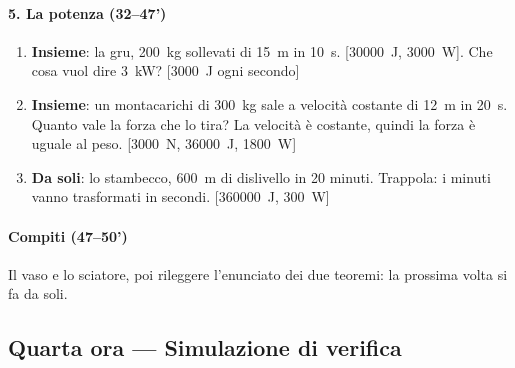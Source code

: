 \documentclass[11pt]{report}
\begin{document}
\paragraph{5. La potenza (32--47')}
\begin{enumerate}
  \item \textbf{Insieme}: la gru, \SI{200}{\kilogram} sollevati di \SI{15}{\metre} in \SI{10}{\second}. [\SI{30000}{\joule}, \SI{3000}{\watt}]. Che cosa vuol dire \SI{3}{\kilo\watt}? [\SI{3000}{\joule} ogni secondo]
  \item \textbf{Insieme}: un montacarichi di \SI{300}{\kilogram} sale a velocità costante di \SI{12}{\metre} in \SI{20}{\second}. Quanto vale la forza che lo tira? La velocità è costante, quindi la forza è uguale al peso. [\SI{3000}{\newton}, \SI{36000}{\joule}, \SI{1800}{\watt}]
  \item \textbf{Da soli}: lo stambecco, \SI{600}{\metre} di dislivello in 20 minuti. Trappola: i minuti vanno trasformati in secondi. [\SI{360000}{\joule}, \SI{300}{\watt}]
\end{enumerate}

\paragraph{Compiti (47--50')}
Il vaso e lo sciatore, poi rileggere l'enunciato dei due teoremi: la prossima volta si fa da soli.

\subsection*{Quarta ora --- Simulazione di verifica}
\end{document}
